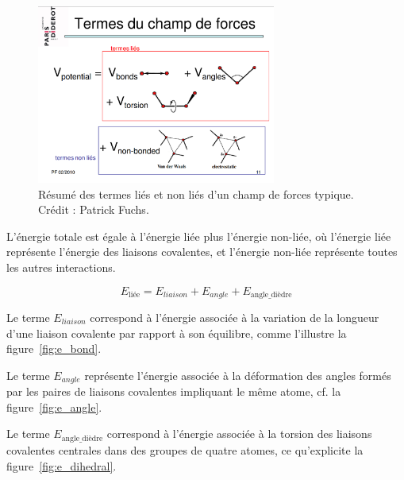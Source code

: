 	\begin{figure}[H]
		\centering
		\includegraphics[width=0.7\textwidth]{figures/ch1/ffterms}
		\caption[Termes d'un champ de forces.]{Résumé des termes liés et non liés d'un champ de forces typique. Crédit : Patrick Fuchs\footnotemark.}
		\label{fig:ffterms}
	\end{figure}	
	
	L'énergie totale est égale à l'énergie liée plus l'énergie non-liée, où l'énergie liée représente l'énergie des liaisons covalentes, et l'énergie non-liée représente toutes les autres interactions.
	
	\begin{equation}
		\label{eq:ebonded}
		E_\text{liée} = E_{liaison} + E_{angle} + E_\text{angle\_{}dièdre}
	\end{equation}
	
	Le terme $E_{liaison}$ correspond à l'énergie associée à la variation de la longueur d'une liaison covalente par rapport à son équilibre, comme l'illustre la figure~\ref{fig:e_bond}.
	
	Le terme $E_{angle}$ représente l'énergie associée à la déformation des angles formés par les paires de liaisons covalentes impliquant le même atome, cf. la figure~\ref{fig:e_angle}.
	
	Le terme $E_\text{angle\_{}dièdre}$ correspond à l'énergie associée à la \og torsion \fg{} des liaisons covalentes centrales dans des groupes de quatre atomes, ce qu'explicite la figure~\ref{fig:e_dihedral}.
	
